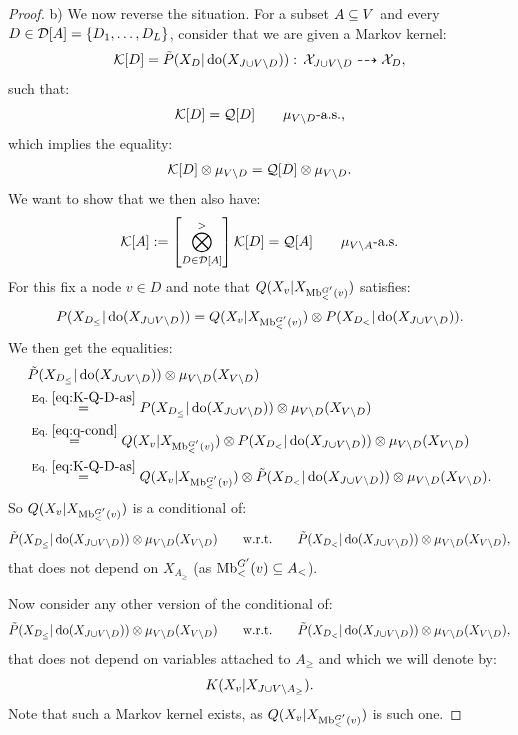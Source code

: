 \begin{Thm}
\begin{proof}
       b) We now reverse the situation. For a subset $A \subseteq V$ and every $D \in \mathcal{D}[A]=\left \{ D_1,\dots,D_L\right \}$, 
       consider that we are given a Markov kernel:
       \[ \mathcal{K}[D]=\tilde P(X_{D}|\operatorname{do}(X_{J \cup V \setminus D})) :\, \mathcal{X}_{J \cup V \setminus D} \dashrightarrow \mathcal{X}_{D}, \]
        such that:
       \[ \mathcal{K}[D] = \mathcal{Q}[D]\qquad \mu_{V\setminus D}\text{-a.s.,}  \]
       which implies the equality:
        \begin{align}
            \mathcal{K}[D] \otimes \mu_{V\setminus D} = \mathcal{Q}[D]\otimes \mu_{V\setminus D}. \label{eq:K-Q-D-as} 
        \end{align}
       We want to show that we then also have:
       \[ \mathcal{K}[A]:= \left [ \bigotimes_{D \in \mathcal{D}[A]}^> \right ]  \mathcal{K}[D] = \mathcal{Q}[A] \qquad \mu_{V\setminus A}\text{-a.s.} \]
       For this fix a node $v \in D$ and note that 
        $Q(X_v|X_{\mathrm{Mb}^{G'}_<(v)})$ satisfies:
        \begin{align} P(X_{D_\le}|\operatorname{do}(X_{J \cup V \setminus D})) = Q(X_v|X_{\mathrm{Mb}^{G'}_<(v)}) \otimes 
            P(X_{D_<}|\operatorname{do}(X_{J \cup V \setminus D})). \label{eq:q-cond}
        \end{align}
        We then get the equalities:
            \begin{align*}
               & \tilde P(X_{D_\le}|\doit(X_{J \cup V \sm D})) \otimes \mu_{V\sm D}(X_{V\sm D}) \\
               &\stackrel{\text{Eq.\ }\ref{eq:K-Q-D-as}}{=}  P(X_{D_\le}|\doit(X_{J \cup V \sm D})) \otimes \mu_{V\sm D}(X_{V\sm D}) \\
               &\stackrel{\text{Eq.\ }\ref{eq:q-cond}}{=}  Q(X_v|X_{\MBl^{G'}_<(v)}) \otimes  P(X_{D_<}|\doit(X_{J \cup V \sm D})) \otimes \mu_{V\sm D}(X_{V\sm D}) \\ 
               &\stackrel{\text{Eq.\ }\ref{eq:K-Q-D-as}}{=}  Q(X_v|X_{\MBl^{G'}_<(v)}) \otimes  \tilde P(X_{D_<}|\doit(X_{J \cup V \sm D})) \otimes \mu_{V\sm D}(X_{V\sm D}). 
            \end{align*}
             So $Q(X_v|X_{\mathrm{Mb}^{G'}_<(v)})$ is a conditional of:
    \[  \tilde P(X_{D_\le}|\operatorname{do}(X_{J \cup V \setminus D})) \otimes \mu_{V\setminus D}(X_{V\setminus D}) \qquad \text{w.r.t.} \qquad
         \tilde P(X_{D_<}|\operatorname{do}(X_{J \cup V \setminus D}))\otimes \mu_{V\setminus D}(X_{V\setminus D}), \] 
         that  does not depend on $X_{A_\ge}$ (as $\mathrm{Mb}^{G'}_<(v) \subseteq A_<$).

      Now consider any other version of the conditional of:
         \[  \tilde P(X_{D_\le}|\operatorname{do}(X_{J \cup V \setminus D})) \otimes \mu_{V\setminus D}(X_{V\setminus D}) \qquad \text{w.r.t.} \qquad
          \tilde P(X_{D_<}|\operatorname{do}(X_{J \cup V \setminus D}))\otimes \mu_{V\setminus D}(X_{V\setminus D}), \] 
    that does not depend on variables attached to $A_\ge$ and which we will denote by:
        \[ K(X_v|X_{J \cup V \setminus A_\ge}). \]
      Note that such a Markov kernel exists, as $Q(X_v|X_{\mathrm{Mb}^{G'}_<(v)})$ is such one.


\end{proof}
\end{Thm}
